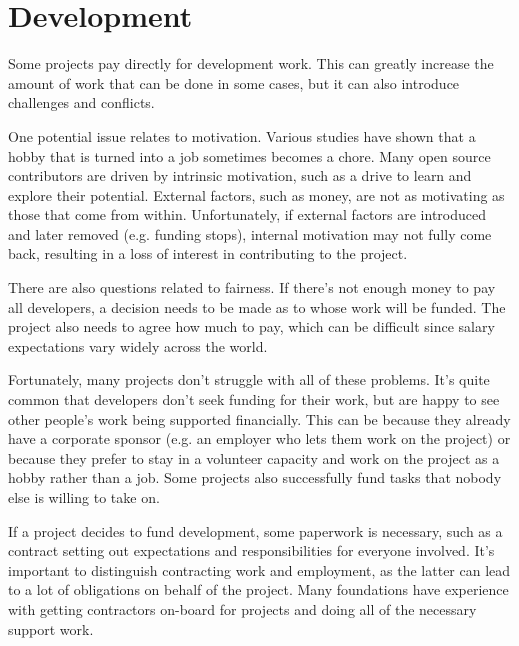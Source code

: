 


\chapter{Development}

Some projects pay directly for development work.  This can greatly increase the amount of work that can be done in some cases, but it can also introduce challenges and conflicts.

One potential issue relates to motivation.  Various studies have shown that a hobby that is turned into a job sometimes becomes a chore.  Many open source contributors are driven by intrinsic motivation, such as a drive to learn and explore their potential.  External factors, such as money, are not as motivating as those that come from within.  Unfortunately, if external factors are introduced and later removed (e.g. funding stops), internal motivation may not fully come back, resulting in a loss of interest in contributing to the project.

There are also questions related to fairness.  If there's not enough money to pay all developers, a decision needs to be made as to whose work will be funded.  The project also needs to agree how much to pay, which can be difficult since salary expectations vary widely across the world.

Fortunately, many projects don't struggle with all of these problems.  It's quite common that developers don't seek funding for their work, but are happy to see other people's work being supported financially.  This can be because they already have a corporate sponsor (e.g. an employer who lets them work on the project) or because they prefer to stay in a volunteer capacity and work on the project as a hobby rather than a job.  Some projects also successfully fund tasks that nobody else is willing to take on.

If a project decides to fund development, some paperwork is necessary, such as a contract setting out expectations and responsibilities for everyone involved.  It's important to distinguish contracting work and employment, as the latter can lead to a lot of obligations on behalf of the project.  Many foundations have experience with getting contractors on-board for projects and doing all of the necessary support work.


